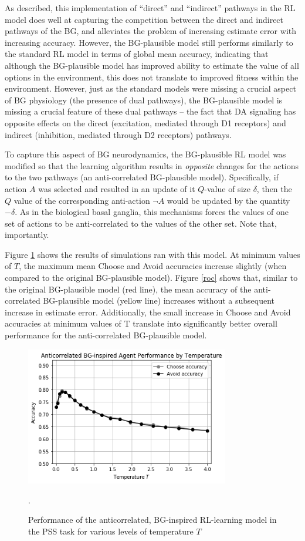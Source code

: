 \documentclass[10pt,letterpaper]{article}
\begin{document}
As described, this implementation of ``direct'' and ``indirect'' pathways in the RL model does well at capturing the competition between the direct and indirect pathways of the BG, and alleviates the problem of increasing estimate error with increasing accuracy. However, the BG-plausible model still performs similarly to the standard RL model in terms of global mean accuracy, indicating that although the BG-plausible model has improved ability to estimate the value of all options in the environment, this does not translate to improved fitness within the environment. However, just as the standard models were missing a crucial aspect of BG physiology (the presence of dual pathways), the BG-plausible model is missing a crucial feature of these dual pathways -- the fact that DA signaling has opposite effects on the direct (excitation, mediated through D1 receptors) and indirect (inhibition, mediated through D2 receptors) pathways. 

To capture this aspect of BG neurodynamics, the BG-plausible RL model was modified so that the learning algorithm results in \emph{opposite} changes for the actions to the two pathways (an anti-correlated BG-plausible model). Specifically, if action $A$ was selected and resulted in an update  of it $Q$-value of size $\delta$, then the $Q$ value of the corresponding anti-action $\neg A$ would be updated by the quantity $-\delta$. As in the biological basal ganglia, this mechanisms forces the values of one set of actions to be anti-correlated to the values of the other set. Note that, importantly.

Figure \ref{bg-anti-agent} shows the results of simulations ran with this model. At minimum values of $T$, the maximum mean Choose and Avoid accuracies increase slightly (when compared to the original BG-plausible model). Figure \ref{roc} shows that, similar to the original BG-plausible model (red line), the mean accuracy of the anti-correlated BG-plausible model (yellow line) increases without a subsequent increase in estimate error. Additionally, the small increase in Choose and Avoid accuracies at minimum values of T translate into significantly better overall performance for the anti-correlated BG-plausible model. 

\begin{figure}[ht]
	\begin{center}
		\includegraphics[width=3.5in]{bg-anti-agent-performance.png}
	\end{center}
	\caption{Performance of the anticorrelated, BG-inspired RL-learning model in the PSS task for various levels of temperature $T$}.
	\label{bg-anti-agent}
\end{figure}
\end{document}
